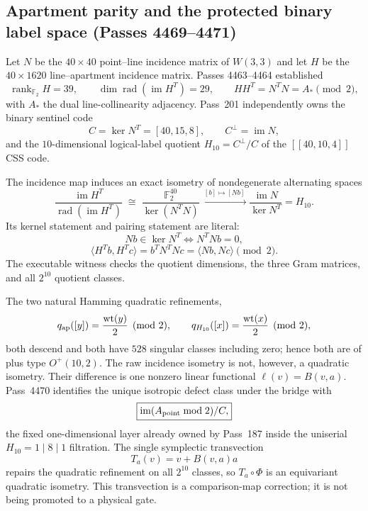 \subsection{Apartment parity and the protected binary label space (Passes 4469--4471)}
\label{sec:pass4469-apartment-h10-bridge}

Let $N$ be the $40\times40$ point--line incidence matrix of $W(3,3)$ and
let $H$ be the $40\times1620$ line--apartment incidence matrix.  Passes
4463--4464 established
\[
 \operatorname{rank}_{\mathbb F_2}H=39,
 \qquad
 \dim\operatorname{rad}(\operatorname{im}H^T)=29,
 \qquad
 H H^T=N^TN=A_*\pmod2,
\]
with $A_*$ the dual line-collinearity adjacency.  Pass~201 independently
owns the binary sentinel code
\[
 C=\ker N^T=[40,15,8],
 \qquad C^\perp=\operatorname{im}N,
\]
and the $10$-dimensional logical-label quotient
$H_{10}=C^\perp/C$ of the $[[40,10,4]]$ CSS code.

\begin{theorem}
The incidence map induces an exact isometry of nondegenerate alternating
spaces
\[
 \boxed{
 \frac{\operatorname{im}H^T}{\operatorname{rad}(\operatorname{im}H^T)}
 \;\cong\;
 \frac{\mathbb F_2^{40}}{\ker(N^TN)}
 \xrightarrow{\ [b]\mapsto[Nb]\ }
 \frac{\operatorname{im}N}{\ker N^T}
 =H_{10}.}
\]
Its kernel statement and pairing statement are literal:
\[
 Nb\in\ker N^T\iff N^TN b=0,
\]
\[
 \langle H^Tb,H^Tc\rangle
 =b^TN^TNc
 =\langle Nb,Nc\rangle\pmod2.
\]
The executable witness checks the quotient dimensions, the three Gram
matrices, and all $2^{10}$ quotient classes.
\end{theorem}

The two natural Hamming quadratic refinements,
\[
 q_{\rm ap}([y])=\frac{\operatorname{wt}(y)}2\pmod2,
 \qquad
 q_{H_{10}}([x])=\frac{\operatorname{wt}(x)}2\pmod2,
\]
both descend and both have $528$ singular classes including zero; hence
both are of plus type $O^+(10,2)$.  The raw incidence isometry is not,
however, a quadratic isometry.  Their difference is one nonzero linear
functional $\ell(v)=B(v,a)$.  Pass~4470 identifies the unique isotropic
defect class under the bridge with
\[
 \boxed{\operatorname{im}(A_{\rm point}\bmod2)/C,}
\]
the fixed one-dimensional layer already owned by Pass~187 inside the
uniserial $H_{10}=1\mid8\mid1$ filtration.  The single symplectic
transvection
\[
 T_a(v)=v+B(v,a)a
\]
repairs the quadratic refinement on all $2^{10}$ classes, so
$T_a\circ\Phi$ is an equivariant quadratic isometry.  This transvection
is a comparison-map correction; it is not being promoted to a physical
gate.


